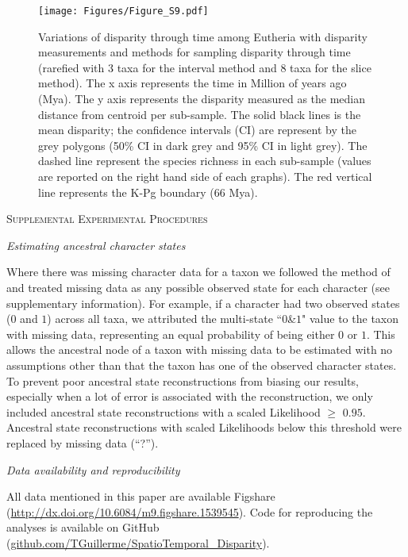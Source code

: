 \documentclass[12pt,letterpaper]{article}
\renewcommand{\section}[1]{%
\bigskip
\begin{center}
\begin{Large}
\normalfont\scshape #1
\medskip
\end{Large}
\end{center}}
\renewcommand{\subsection}[1]{%
\bigskip
\begin{center}
\begin{large}
\normalfont\itshape #1
\end{large}
\end{center}}
\begin{document}
\begin{landscape}
\begin{figure}[!htbp]
\centering
    \texttt{[image: Figures/Figure\_S9.pdf]}
\caption{\scriptsize{Variations of disparity through time among Eutheria with disparity measurements and methods for sampling disparity through time (rarefied with 3 taxa for the interval method and 8 taxa for the slice method). The x axis represents the time in Million of years ago (Mya). The y axis represents the disparity measured as the median distance from centroid per sub-sample. The solid black lines is the mean disparity; the confidence intervals (CI) are represent by the grey polygons (50\% CI in dark grey and 95\% CI in light grey). The dashed line represent the species richness in each sub-sample (values are reported on the right hand side of each graphs). The red vertical line represents the K-Pg boundary (66 Mya).}}
\end{figure}
\end{landscape}

\section{Supplemental Experimental Procedures}

\subsection{Estimating ancestral character states}
Where there was missing character data for a taxon we followed the method of \cite{Claddis} and treated missing data as any possible observed state for each character (see supplementary information).
For example, if a character had two observed states ($0$ and $1$) across all taxa, we attributed the multi-state ``$0$\&$1$" value to the taxon with missing data, representing an equal probability of being either $0$ or $1$.
This allows the ancestral node of a taxon with missing data to be estimated with no assumptions other than that the taxon has one of the observed character states.
To prevent poor ancestral state reconstructions from biasing our results, especially when a lot of error is associated with the reconstruction, we only included ancestral state reconstructions with a scaled Likelihood $\geq$ $0.95$.
Ancestral state reconstructions with scaled Likelihoods below this threshold were replaced by missing data (``?'').

\subsection{Data availability and reproducibility}
All data mentioned in this paper are available Figshare (\url{http://dx.doi.org/10.6084/m9.figshare.1539545}).
Code for reproducing the analyses is available on GitHub (\url{github.com/TGuillerme/SpatioTemporal_Disparity}).
\end{document}
